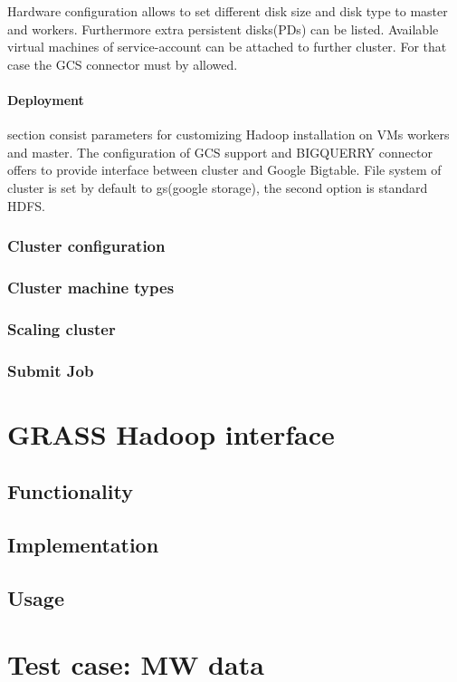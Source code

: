 \documentclass[a4paper,12pt,oneside]{report}
\begin{document}
Hardware configuration allows to set different disk size and  disk type to master and workers. Furthermore extra persistent disks(PDs) can be listed. Available virtual machines of service-account can be attached to further cluster. For that case the GCS connector must by allowed.

\paragraph{Deployment} section consist parameters for customizing Hadoop installation on VMs workers and master. The configuration of GCS support and BIGQUERRY connector offers to provide interface between cluster and Google Bigtable. File system of cluster is set by default to gs(google storage), the second option is standard HDFS. 





			\subsubsection{Cluster configuration}
			\subsubsection{Cluster machine types}
			\subsubsection{Scaling cluster}
			\subsubsection{Submit Job}
		
\section{GRASS Hadoop interface}
	\subsection{Functionality}
	\subsection{Implementation}
	\subsection{Usage}
				
\section{Test case: MW data}
\end{document}
